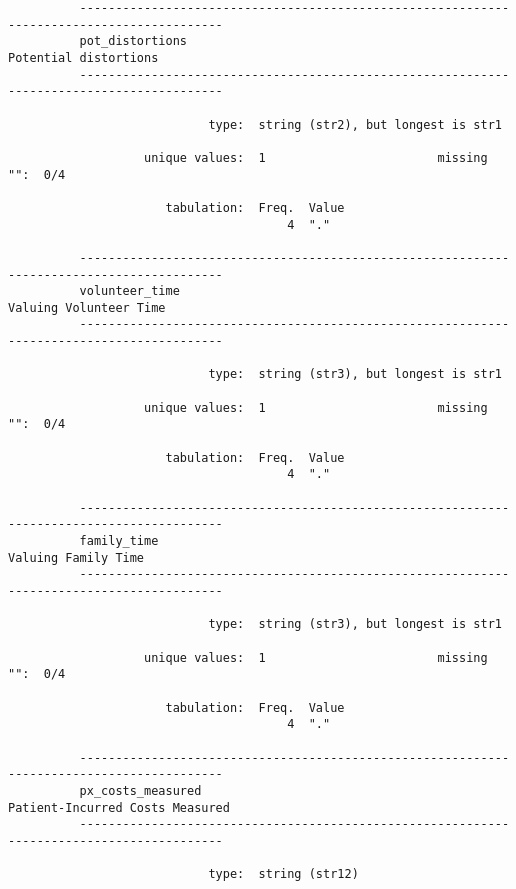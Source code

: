 \documentclass{article}
\begin{document}
\begin{verbatim}
          ------------------------------------------------------------------------------------------
          pot_distortions                                                      Potential distortions
          ------------------------------------------------------------------------------------------
          
                            type:  string (str2), but longest is str1
          
                   unique values:  1                        missing "":  0/4
          
                      tabulation:  Freq.  Value
                                       4  "."
          
          ------------------------------------------------------------------------------------------
          volunteer_time                                                      Valuing Volunteer Time
          ------------------------------------------------------------------------------------------
          
                            type:  string (str3), but longest is str1
          
                   unique values:  1                        missing "":  0/4
          
                      tabulation:  Freq.  Value
                                       4  "."
          
          ------------------------------------------------------------------------------------------
          family_time                                                            Valuing Family Time
          ------------------------------------------------------------------------------------------
          
                            type:  string (str3), but longest is str1
          
                   unique values:  1                        missing "":  0/4
          
                      tabulation:  Freq.  Value
                                       4  "."
          
          ------------------------------------------------------------------------------------------
          px_costs_measured                                          Patient-Incurred Costs Measured
          ------------------------------------------------------------------------------------------
          
                            type:  string (str12)
          

\end{verbatim}
\end{document}
